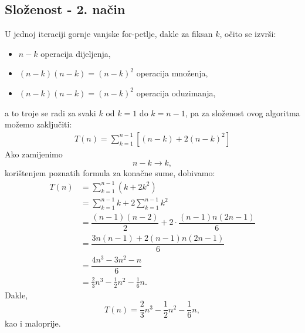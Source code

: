 \documentclass[a4paper,12pt,oneside]{article}
\begin{document}
\subsection*{Složenost - 2. način}
U jednoj iteraciji gornje vanjske for-petlje, dakle za fiksan $k$, očito se izvrši:
\begin{itemize}
	\item $n-k$ operacija dijeljenja,
	\item $(n-k)(n-k)=(n-k)^2$ operacija množenja,
	\item $(n-k)(n-k)=(n-k)^2$ operacija oduzimanja,
\end{itemize}
a to troje se radi za svaki $k$ od $k=1$ do $k=n-1$, pa za složenost ovog algoritma možemo zaključiti:
\begin{align*}
	T(n)=\sum_{k=1}^{n-1}\left[(n-k)+2(n-k)^2\right]
\end{align*}
Ako zamijenimo 
$$n-k \rightarrow k,$$
korištenjem poznatih formula za konačne sume, dobivamo:
\begin{align*}
	T(n)&=\sum_{k=1}^{n-1}\left(k+2k^2\right) \\
	&=\sum_{k=1}^{n-1}k + 2\sum_{k=1}^{n-1}k^2 \\
	&=\dfrac{(n-1)(n-2)}{2} + 2\cdot\dfrac{(n-1)n(2n-1)}{6} \\
	&=\dfrac{3n(n-1)+2(n-1)n(2n-1)}{6} \\
	&=\dfrac{4n^3-3n^2-n}6 \\
	&=\frac23n^3-\frac12n^2-\frac16n.
\end{align*}
Dakle,
$$\boxed{T(n)=\dfrac23n^3-\dfrac12n^2-\dfrac16 n},$$
kao i maloprije.
\newpage
\end{document}
